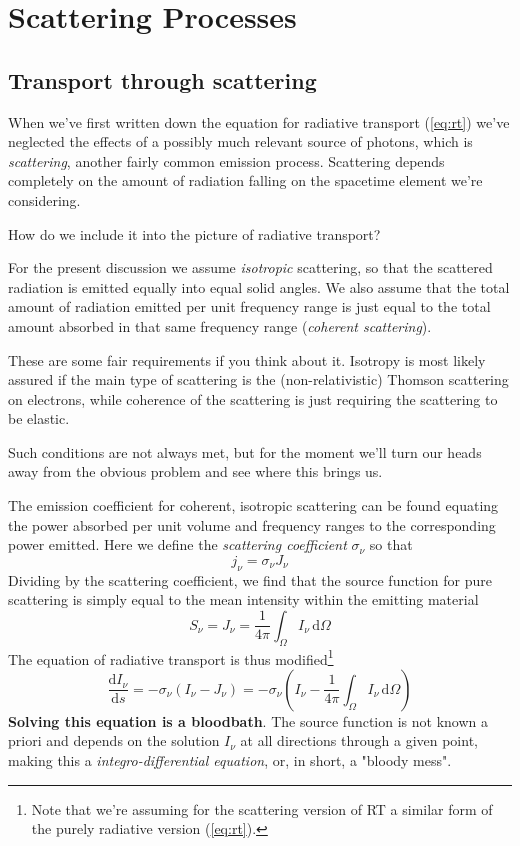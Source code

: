 
\chapter{Scattering Processes}\label{ch:iii}

\section{Transport through scattering}

When we've first written down the equation for radiative transport (\ref{eq:rt}) we've neglected the effects of a possibly much relevant source of photons, which is \emph{scattering}, another fairly common emission process. Scattering depends completely on the amount of radiation falling on the spacetime element we're considering.
\par How do we include it into the picture of radiative transport?
\par For the present discussion we assume \emph{isotropic} scattering, so that the scattered radiation is emitted equally into equal solid angles. We also assume that the total amount of radiation emitted per unit frequency range is just equal to the total amount absorbed in that same frequency range (\emph{coherent scattering}).
\par These are some fair requirements if you think about it. Isotropy is most likely assured if the main type of scattering is the (non-relativistic) Thomson scattering on electrons, while coherence of the scattering is just requiring the scattering to be elastic.
\par Such conditions are not always met, but for the moment we'll turn our heads away from the obvious problem and see where this brings us.
\par The emission coefficient for coherent, isotropic scattering can be found equating the power absorbed per unit volume and frequency ranges to the corresponding power emitted. Here we define the \emph{scattering coefficient} $\sigma_{\nu}$ so that 
\begin{equation*}
    j_{\nu} = \sigma_{\nu}J_{\nu}
\end{equation*}
Dividing by the scattering coefficient, we find that the source function for pure scattering is simply equal to the mean intensity within the emitting material
\begin{equation*}
    S_{\nu} = J_{\nu} = \frac{1}{4\pi}\int_{\Omega} I_{\nu}\,\text{d}\Omega
\end{equation*}
The equation of radiative transport is thus modified\footnote{Note that we're assuming for the scattering version of RT a similar form of the purely radiative version (\ref{eq:rt}).}
\begin{equation}
    \frac{\text{d}I_{\nu}}{\text{d}s} = -\sigma_{\nu}(I_{\nu}-J_{\nu}) = -\sigma_{\nu}(I_{\nu}-\frac{1}{4\pi}\int_{\Omega} I_{\nu}\,\text{d}\Omega)
    \label{eq:rtscattering}
\end{equation}
\textbf{Solving this equation is a bloodbath}. The source function is not known a priori and depends on the solution $I_{\nu}$ at all directions through a given point, making this a \emph{integro-differential equation}, or, in short, a "bloody mess".
